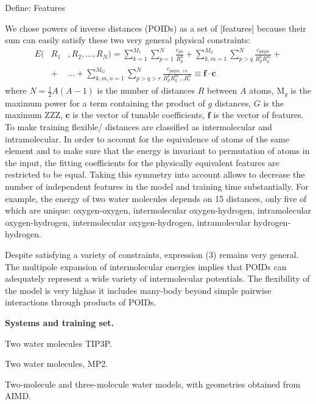\documentclass[aps,prl,reprint,amsmath,amssymb,nature]{revtex4-1}
\begin{document}
Define: Features

We chose powers of inverse distances (POIDs) as a set of [features] because their sum can easily satisfy these two very general physical constraints:
\begin{eqnarray}
E (&R_1&, R_2, \ldots, R_N) = \sum_{k=1}^{M_1} \sum_{p=1}^{N} \frac{c_{pk}}{R_p^k} + \sum_{k,m=1}^{M_2} \sum_{p>q}^{N} \frac{c_{pkqm}}{R_p^k R_q^m} + \nonumber \\
&+& \ldots +\sum_{k,m,n=1}^{M_G} \sum_{p>q>r}^{N} \frac{c_{pkqm\ldots rn}}{R_p^k R_q^m \ldots R_r^n} \equiv \mathbf{f}\cdot \mathbf{c}
\end{eqnarray}
%
where $N = \frac{1}{2}A(A-1)$ is the number of distances $R$ between $A$ atoms, M$_{g}$ is the maximum power for a term containing the product of $g$ distances, $G$ is the maximum ZZZ, $\mathbf{c}$ is the vector of tunable coefficients, $\mathbf{f}$ is the vector of features. 
\red To make training flexible/ distances are classified as intermolecular and intramolecular. \old 
In order to account for the equivalence of atoms of the same element and to make sure that the energy is invariant to permutation of atoms in the input, the fitting coefficients for the physically equivalent features are restricted to be equal. 
Taking this symmetry into account allows to decrease the number of independent features in the model and training time substantially. 
For example, the energy of two water molecules depends on 15 distances, only five of which are unique: oxygen-oxygen, intermolecular oxygen-hydrogen, intramolecular oxygen-hydrogen, intermolecular oxygen-hydrogen, intramolecular hydrogen-hydrogen.

Despite satisfying a variety of constraints, expression (3) remains very general. 
The multipole expansion of intermolecular energies implies that POIDs can adequately represent a wide variety of intermolecular potentials. 
The flexibility of the model \red is very high\old as it includes many-body beyond simple pairwise interactions through products 
of POIDs.

\textbf{Systems and training set.} 


Two water molecules TIP3P.

Two water molecules, MP2.

Two-molecule and three-molecule water models, with geometries obtained 
from AIMD.
\end{document}
